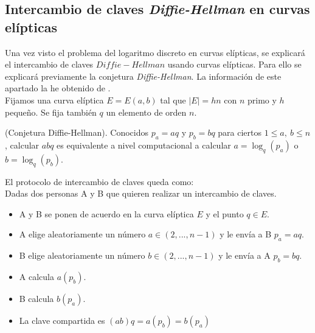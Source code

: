 \begin{aligned*}
\subsection{Intercambio de claves \emph{Diffie-Hellman} en curvas elípticas}
Una vez visto el problema del logaritmo discreto en curvas elípticas, se explicará el intercambio de claves $Diffie-Hellman$ usando curvas elípticas. Para ello se explicará previamente la conjetura \emph{Diffie-Hellman}. La información de este apartado la he obtenido de \cite{apuntesCriptografia}.\\
Fijamos una curva elíptica $E=E(a,b)$ tal que $|E|=hn$ con $n$ primo y $h$ pequeño. Se fija también $q$ un elemento de orden $n$.
\begin{definicion}
	(Conjetura Diffie-Hellman). Conocidos $p_a=aq$ y $p_b=bq$ para ciertos $1\leq a,\: b\leq n$, calcular $abq$ es equivalente a nivel computacional a calcular $a=\log_q(p_a)$ o $b=\log_q(p_b)$.
\end{definicion}
El protocolo de intercambio de claves queda como:\\

Dadas dos personas A y B que quieren realizar un intercambio de claves.
\begin{itemize}
	\item A y B se ponen de acuerdo en la curva elíptica $E$ y el punto $q\in E$.
	\item A elige aleatoriamente un número $a\in(2,...,n-1)$ y le envía a B $p_a=aq$.
	\item B elige aleatoriamente un número $b\in(2,...,n-1)$ y le envía a A $p_b=bq$.
	\item A calcula $a(p_b)$.
	\item B calcula $b(p_a)$.
	\item La clave compartida es $(ab)q=a(p_b)=b(p_a)$
\end{itemize}


\end{aligned*}
